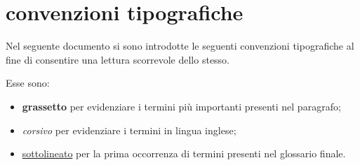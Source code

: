 %
%
\section[Convenzioni tipografiche]{convenzioni tipografiche}
\label{abs-hightlighting}
Nel seguente documento si sono introdotte le seguenti convenzioni tipografiche al fine di consentire una lettura scorrevole dello stesso.

Esse sono:

\begin{itemize}
\item{\textbf{grassetto} per evidenziare i termini più importanti presenti nel paragrafo;}
\item{\textit{corsivo} per evidenziare i termini in lingua inglese;}
\item{\underline{sottolineato} per la prima occorrenza di termini presenti nel glossario finale.}
\end{itemize}